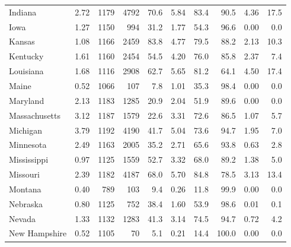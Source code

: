 \begin{tabular}{lrrrrrrrrr}
Indiana & \num{2.72} & \num{1179} & \num{4792} & \num{70.6} & \num{5.84} & \num{83.4} & \num{90.5} & \num{4.36} & \num{17.5} \\
Iowa & \num{1.27} & \num{1150} & \num{994} & \num{31.2} & \num{1.77} & \num{54.3} & \num{96.6} & \num{0.00} & \num{0.0} \\
Kansas & \num{1.08} & \num{1166} & \num{2459} & \num{83.8} & \num{4.77} & \num{79.5} & \num{88.2} & \num{2.13} & \num{10.3} \\
Kentucky & \num{1.61} & \num{1160} & \num{2454} & \num{54.5} & \num{4.20} & \num{76.0} & \num{85.8} & \num{2.37} & \num{7.4} \\
Louisiana & \num{1.68} & \num{1116} & \num{2908} & \num{62.7} & \num{5.65} & \num{81.2} & \num{64.1} & \num{4.50} & \num{17.4} \\
Maine & \num{0.52} & \num{1066} & \num{107} & \num{7.8} & \num{1.01} & \num{35.3} & \num{98.4} & \num{0.00} & \num{0.0} \\
Maryland & \num{2.13} & \num{1183} & \num{1285} & \num{20.9} & \num{2.04} & \num{51.9} & \num{89.6} & \num{0.00} & \num{0.0} \\
Massachusetts & \num{3.12} & \num{1187} & \num{1579} & \num{22.6} & \num{3.31} & \num{72.6} & \num{86.5} & \num{1.07} & \num{5.7} \\
Michigan & \num{3.79} & \num{1192} & \num{4190} & \num{41.7} & \num{5.04} & \num{73.6} & \num{94.7} & \num{1.95} & \num{7.0} \\
Minnesota & \num{2.49} & \num{1163} & \num{2005} & \num{35.2} & \num{2.71} & \num{65.6} & \num{93.8} & \num{0.63} & \num{2.8} \\
Mississippi & \num{0.97} & \num{1125} & \num{1559} & \num{52.7} & \num{3.32} & \num{68.0} & \num{89.2} & \num{1.38} & \num{5.0} \\
Missouri & \num{2.39} & \num{1182} & \num{4187} & \num{68.0} & \num{5.70} & \num{84.8} & \num{78.5} & \num{3.13} & \num{13.4} \\
Montana & \num{0.40} & \num{789} & \num{103} & \num{9.4} & \num{0.26} & \num{11.8} & \num{99.9} & \num{0.00} & \num{0.0} \\
Nebraska & \num{0.80} & \num{1125} & \num{752} & \num{38.4} & \num{1.60} & \num{53.9} & \num{98.6} & \num{0.01} & \num{0.1} \\
Nevada & \num{1.33} & \num{1132} & \num{1283} & \num{41.3} & \num{3.14} & \num{74.5} & \num{94.7} & \num{0.72} & \num{4.2} \\
New Hampshire & \num{0.52} & \num{1105} & \num{70} & \num{5.1} & \num{0.21} & \num{14.4} & \num{100.0} & \num{0.00} & \num{0.0} \\

\end{tabular}
